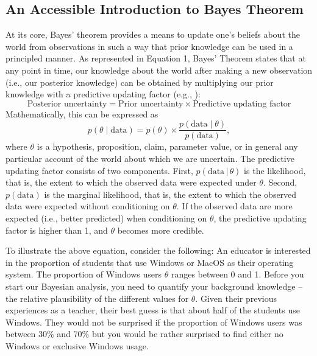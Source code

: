 \documentclass[man]{apa7}
\newcommand{\given}{\, | \,}
\begin{document}
\subsection{An Accessible Introduction to Bayes Theorem}

At its core, Bayes' theorem provides a means to update one's beliefs about the world from observations in such a way that prior knowledge can be used in a principled manner. As represented in Equation 1, Bayes' Theorem states that at any point in time, our knowledge about the world after making a new observation (i.e., our posterior knowledge) can be obtained by multiplying our prior knowledge with a predictive updating factor (e.g., \cite{RouderMorey2019,WagenmakersEtAl2016CD} ):
\begin{equation*}
        \text{Posterior uncertainty} = \text{Prior uncertainty} \times \text{Predictive updating factor}
\end{equation*}
Mathematically, this can be expressed as  
\begin{equation}
\label{eq:BayesRule}
        p(\theta \mid \text{data}) = p(\theta) \times \frac{p(\text{data} \mid \theta)}{p(\text{data})},
\end{equation}
where $\theta$ is a hypothesis, proposition, claim, parameter value, or in general any particular account of the world about which we are uncertain. The predictive updating factor consists of two components. First, $p(\text{data} \given \theta)$ is the likelihood, that is, the extent to which the observed data were expected under $\theta$. Second, $p(\text{data})$ is the marginal likelihood, that is, the extent to which the observed data were expected without conditioning on $\theta$. If the observed data are more expected (i.e., better predicted) when conditioning on $\theta$, the predictive updating factor is higher than 1, and $\theta$ becomes more credible. 

To illustrate the above equation, consider the following: An educator is interested in the proportion of students that use Windows or MacOS as their operating system. The proportion of Windows users $\theta$ ranges between 0 and 1. Before you start our Bayesian analysis, you need to quantify your background knowledge -- the relative plausibility of the different values for $\theta$. Given their previous experiences as a teacher, their best guess is that about half of the students use Windows. They would not be surprised if the proportion of Windows users was between 30\% and 70\% but you would be rather surprised to find either no Windows or exclusive Windows usage. 
\end{document}
